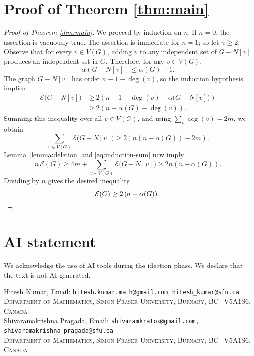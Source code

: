 \documentclass[11pt]{article}
\theoremstyle{plain}
\numberwithin{equation}{section}
\begin{document}
\section{Proof of Theorem \ref{thm:main}}
\label{sec:main_proof}

\begin{proof}[Proof of Theorem \ref{thm:main}]
We proceed by induction on $n$. If $n = 0$, the assertion is vacuously true. The assertion is immediate for $n=1$; so let $n\ge 2$. Observe that for every
$v\in V(G)$, adding $v$ to any independent set of $G-N[v]$ produces an independent set in $G$. Therefore, for any $v\in V(G)$,
\[ \alpha\left(G-N[v]\right)\le\alpha(G)-1.\]
The graph $G-N[v]$ has order $n-1-\deg(v)$, so the induction hypothesis implies
\[
\begin{aligned}
    \mathcal{E}\bigl(G-N[v]\bigr)
    &\ge 2\left(n-1-\deg(v)-\alpha\bigl(G-N[v]\bigr)\right)\\
    &\ge 2 \left(n-\alpha(G)-\deg(v)\right).
\end{aligned}
\]
Summing this inequality over all $v\in V(G)$, and using $\sum_v\deg(v)=2m$, we
obtain
\begin{equation}\label{eq:induction-sum}
    \sum_{v\in V(G)}\mathcal{E}\bigl(G-N[v]\bigr)
    \ge 2\left(n(n-\alpha(G))-2m\right).
\end{equation}
Lemma~\ref{lemma:deletion} and \eqref{eq:induction-sum} now imply
\[
    n\, \mathcal{E}(G)
    \ge 4m+\sum_{v\in V(G)}\mathcal{E}\bigl(G-N[v]\bigr)
    \ge 2n(n-\alpha(G)).
\]
Dividing by $n$ gives the desired inequality 
\[\mathcal{E}(G)\ge 2\left(n-\alpha(G)\right).\qedhere\]
\end{proof}

\section*{AI statement}
We acknowledge the use of AI tools during the ideation phase. We declare that the text is not AI-generated.




\vspace{0.3cm}
\noindent Hitesh Kumar, Email: {\tt hitesh.kumar.math@gmail.com}, {\tt hitesh\_kumar@sfu.ca}\\
\textsc{Department of Mathematics, Simon Fraser University, Burnaby, BC \ V5A1S6, Canada}\\[1pt]

\noindent Shivaramakrishna Pragada,
Email: {\tt shivaramkratos@gmail.com, shivaramakrishna\_pragada@sfu.ca}\\
\textsc{Department of Mathematics, Simon Fraser University, Burnaby, BC \ V5A1S6, Canada}\\[1pt]
\end{document}

